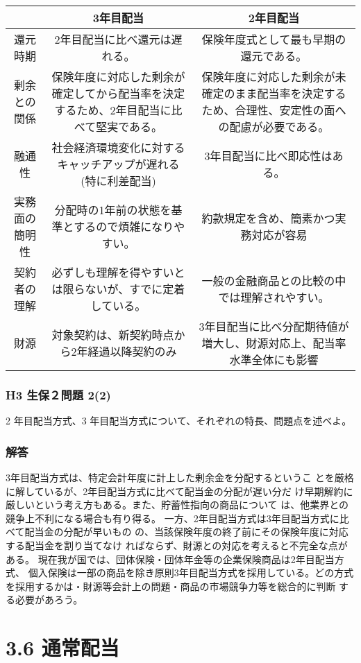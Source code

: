 \documentclass[report,gutter=10mm,fore-edge=10mm,uplatex,dvipdfmx]{jlreq}
\begin{document}
\begin{tabular}{|c|c|c|}
 \hline
 &3年目配当 & 2年目配当\\ \hline
還元時期 &2年目配当に比べ還元は遅れる。 & 保険年度式として最も早期の還元である。\\ \hline
剰余との関係 & 保険年度に対応した剰余が確定してから配当率を決定するため、2年目配当に比べて堅実である。
& 保険年度に対応した剰余が未確定のまま配当率を決定するため、合理性、安定性の面への配慮が必要である。\\ \hline
融通性 & 社会経済環境変化に対するキャッチアップが遅れる(特に利差配当)
& 3年目配当に比べ即応性はある。\\ \hline
実務面の簡明性 & 分配時の1年前の状態を基準とするので煩雑になりやすい。
& 約款規定を含め、簡素かつ実務対応が容易\\ \hline
契約者の理解 & 必ずしも理解を得やすいとは限らないが、すでに定着している。
& 一般の金融商品との比較の中では理解されやすい。\\ \hline
財源 & 対象契約は、新契約時点から2年経過以降契約のみ
& 3年目配当に比べ分配期待値が増大し、財源対応上、配当率水準全体にも影響
\\ \hline
\end{tabular}

\subsubsection{H3 生保２問題 2(2)}
2 年目配当方式、3 年目配当方式について、それぞれの特長、問題点を述べよ。
\subsubsection{解答}
3年目配当方式は、特定会計年度に計上した剰余金を分配するというこ
とを厳格に解しているが、2年目配当方式に比べて配当金の分配が遅い分だ
け早期解約に厳しいという考え方もある。また、貯蓄性指向の商品について
は、他業界との競争上不利になる場合も有り得る。
一方、2年目配当方式は3年目配当方式に比べて配当金の分配が早いもの
の、当該保険年度の終了前にその保険年度に対応する配当金を割り当てなけ
ればならず、財源との対応を考えると不完全な点がある。
現在我が国では、団体保険・団体年金等の企業保険商品は2年目配当方式、
個入保険は一部の商品を除き原則3年目配当方式を採用している。どの方式
を採用するかは・財源等会計上の問題・商品の市場競争力等を総合的に判断
する必要があろう。

\section{3.6 通常配当}
\end{document}

